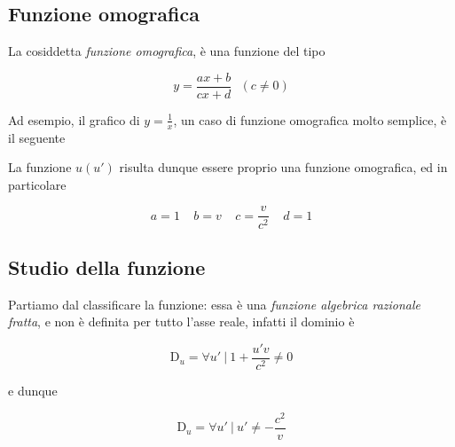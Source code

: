 \documentclass{article}
\begin{document}
\subsection{Funzione omografica}
La cosiddetta \textit{funzione omografica}, è una funzione del tipo

\begin{equation}
    y = \frac{ax + b}{cx + d}\ \ \ (c \neq 0)
\end{equation}

Ad esempio, il grafico di \(y = \frac{1}{x}\), un caso di funzione
omografica molto semplice, è il seguente

\begin{center}
\end{center}

La funzione \(u(u')\) risulta dunque essere proprio una
funzione omografica, ed in particolare

\begin{equation}
    a = 1\ \ \ \ \ b = v\ \ \ \ \ c = \frac{v}{c^2}\ \ \ \ \ d = 1
\end{equation}

\subsection{Studio della funzione}
Partiamo dal classificare la funzione: essa è una \textit{funzione
algebrica razionale fratta}, e non è definita per tutto l'asse reale,
infatti il dominio è

\begin{equation}
    \mathrm{D}_u = \forall u'\ |\ 1 + \frac{u'v}{c^2} \neq 0
\end{equation}

e dunque

\begin{equation}
    \mathrm{D}_u = \forall u'\ |\ u' \neq - \frac{c^2}{v}
\end{equation}
\end{document}
